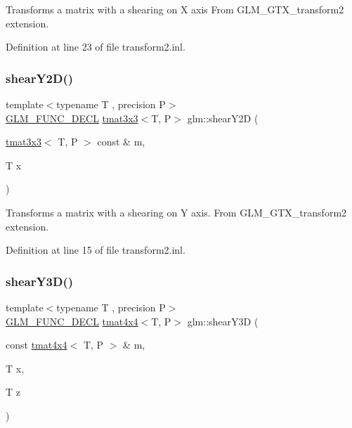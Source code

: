 Transforms a matrix with a shearing on X axis From G\+L\+M\+\_\+\+G\+T\+X\+\_\+transform2 extension. 

Definition at line 23 of file transform2.\+inl.

\mbox{\label{group__gtx__transform2_ga21ade82859e09a5cdaf4a01fbf8dc61b}} 
\subsubsection{\texorpdfstring{shearY2D()}{shearY2D()}}
{\footnotesize\ttfamily template$<$typename T , precision P$>$ \\
\mbox{\hyperlink{setup_8hpp_ab2d052de21a70539923e9bcbf6e83a51}{G\+L\+M\+\_\+\+F\+U\+N\+C\+\_\+\+D\+E\+CL}} \mbox{\hyperlink{structglm_1_1tmat3x3}{tmat3x3}}$<$T, P$>$ glm\+::shear\+Y2D (\begin{DoxyParamCaption}\item[{\mbox{\hyperlink{structglm_1_1tmat3x3}{tmat3x3}}$<$ T, P $>$ const \&}]{m,  }\item[{T}]{x }\end{DoxyParamCaption})}

Transforms a matrix with a shearing on Y axis. From G\+L\+M\+\_\+\+G\+T\+X\+\_\+transform2 extension. 

Definition at line 15 of file transform2.\+inl.

\mbox{\label{group__gtx__transform2_ga31253ea18fdcdfde08c134c8b67688f7}} 
\subsubsection{\texorpdfstring{shearY3D()}{shearY3D()}}
{\footnotesize\ttfamily template$<$typename T , precision P$>$ \\
\mbox{\hyperlink{setup_8hpp_ab2d052de21a70539923e9bcbf6e83a51}{G\+L\+M\+\_\+\+F\+U\+N\+C\+\_\+\+D\+E\+CL}} \mbox{\hyperlink{structglm_1_1tmat4x4}{tmat4x4}}$<$T, P$>$ glm\+::shear\+Y3D (\begin{DoxyParamCaption}\item[{const \mbox{\hyperlink{structglm_1_1tmat4x4}{tmat4x4}}$<$ T, P $>$ \&}]{m,  }\item[{T}]{x,  }\item[{T}]{z }\end{DoxyParamCaption})}

